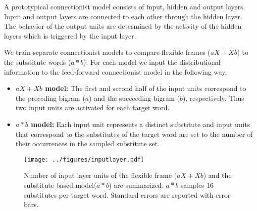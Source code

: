 A prototypical connectionist model consists of input, hidden and
output layers.  Input and output layers are connected to each other
through the hidden layer.  The behavior of the output units are
determined by the activity of the hidden layers which is triggered by
the input layer.

We train separate connectionist models to compare flexible frames ($aX+Xb$) to
the substitute words ($a*b$).  For each model we input the distributional
information to the feed-forward connectionist model in the following way,

\begin{itemize}
\item {\bf$aX+Xb$ model:} The first and second half of the input units
  correspond to the preceding bigram ($a$) and the succeeding bigram
  ($b$), respectively.  Thus two input units are activated for each
  target word.
\item {\bf $a*b$ model:} Each input unit represents a distinct
  substitute and input units that correspond to the substitutes of the
  target word are set to the number of their occurrences in the
  sampled substitute set.
\end{itemize}

\begin{figure}[ht]
  \centering
  \texttt{[image: ../figures/inputlayer.pdf]}
  \caption{Number of input layer units of the flexible frame ($aX + Xb$) and
    the substitute based model($a*b$) are summarized.  $a*b$ samples 16
    substitutes per target word.  Standard errors are reported with error bars. 
  }
  \label{fig:inputunits}
\end{figure}


